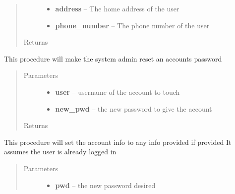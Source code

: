 \documentclass[letterpaper,10pt,english]{sphinxmanual}
\begin{document}
\begin{fulllineitems}
\begin{fulllineitems}
\begin{quote}
\begin{description}
\begin{itemize}
\item {} 
\textbf{address} -- The home address of the user

\item {} 
\textbf{phone\_number} -- The phone number of the user

\end{itemize}

\item[{Returns}] \leavevmode


\end{description}\end{quote}

\end{fulllineitems}


\begin{fulllineitems}
\label{STD/WebUI:WebUI.WebUI.WebUI.reset_user_password}
This procedure will make the system admin reset an accounts password
\begin{quote}\begin{description}
\item[{Parameters}] \leavevmode\begin{itemize}
\item {} 
\textbf{user} -- username of the account to touch

\item {} 
\textbf{new\_pwd} -- the new password to give the account

\end{itemize}

\item[{Returns}] \leavevmode


\end{description}\end{quote}

\end{fulllineitems}


\begin{fulllineitems}
\label{STD/WebUI:WebUI.WebUI.WebUI.set_account_info}
This procedure will set the account info to any info provided if provided
It assumes the user is already logged in
\begin{quote}\begin{description}
\item[{Parameters}] \leavevmode\begin{itemize}
\item {} 
\textbf{pwd} -- the new password desired


\end{itemize}
\end{description}
\end{quote}
\end{fulllineitems}
\end{fulllineitems}
\end{document}
